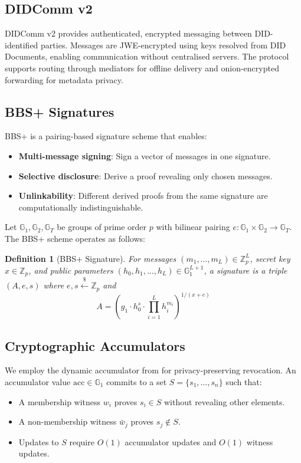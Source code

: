 \documentclass[11pt,a4paper]{article}
\newtheorem{definition}[theorem]{Definition}
\begin{document}
\subsection{DIDComm v2}

DIDComm v2 \cite{didcomm-v2} provides authenticated, encrypted messaging between
DID-identified parties. Messages are JWE-encrypted using keys resolved from DID
Documents, enabling communication without centralised servers. The protocol supports
routing through mediators for offline delivery and onion-encrypted forwarding for
metadata privacy.

\subsection{BBS+ Signatures}

BBS+ \cite{bbs-plus} is a pairing-based signature scheme that enables:
\begin{itemize}
    \item \textbf{Multi-message signing}: Sign a vector of messages in one signature.
    \item \textbf{Selective disclosure}: Derive a proof revealing only chosen messages.
    \item \textbf{Unlinkability}: Different derived proofs from the same signature
          are computationally indistinguishable.
\end{itemize}

Let $\mathbb{G}_1, \mathbb{G}_2, \mathbb{G}_T$ be groups of prime order $p$ with
bilinear pairing $e: \mathbb{G}_1 \times \mathbb{G}_2 \to \mathbb{G}_T$. The BBS+
scheme operates as follows:

\begin{definition}[BBS+ Signature]
For messages $(m_1, \ldots, m_L) \in \mathbb{Z}_p^L$, secret key $x \in \mathbb{Z}_p$,
and public parameters $(h_0, h_1, \ldots, h_L) \in \mathbb{G}_1^{L+1}$, a signature
is a triple $(A, e, s)$ where $e, s \xleftarrow{\$} \mathbb{Z}_p$ and
\[
    A = \left(g_1 \cdot h_0^s \cdot \prod_{i=1}^{L} h_i^{m_i}\right)^{1/(x+e)}
\]
\end{definition}

\subsection{Cryptographic Accumulators}

We employ the dynamic accumulator from \cite{dynamic-acc} for privacy-preserving
revocation. An accumulator value $\text{acc} \in \mathbb{G}_1$ commits to a set
$S = \{s_1, \ldots, s_n\}$ such that:
\begin{itemize}
    \item A membership witness $w_i$ proves $s_i \in S$ without revealing other elements.
    \item A non-membership witness $\bar{w}_j$ proves $s_j \notin S$.
    \item Updates to $S$ require $O(1)$ accumulator updates and $O(1)$ witness updates.
\end{itemize}
\end{document}
